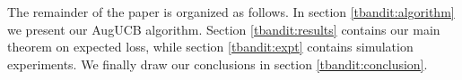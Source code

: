 %

The remainder of the paper is organized as follows. In section \ref{tbandit:algorithm} we present our AugUCB algorithm. 
Section \ref{tbandit:results} contains our main theorem on expected loss, while section \ref{tbandit:expt} contains simulation experiments. We finally draw our conclusions in section \ref{tbandit:conclusion}.
